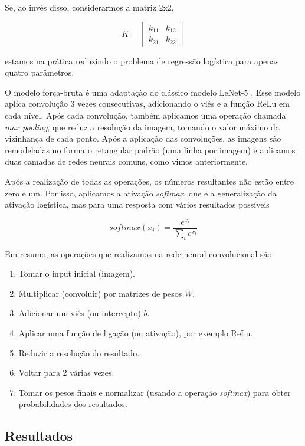 \documentclass[12pt,]{report}
\providecommand{\tightlist}{%
  \setlength{\itemsep}{0pt}\setlength{\parskip}{0pt}}
\begin{document}
Se, ao invés disso, considerarmos a matriz 2x2,

\[
K = \left[\begin{array}{rr}
k_{11} & k_{12}\\ 
k_{21} & k_{22}
\end{array}\right]
\]

estamos na prática reduzindo o problema de regressão logística para
apenas quatro parâmetros.

O modelo força-bruta é uma adaptação do clássico modelo LeNet-5
\citep{lecun2015lenet}. Esse modelo aplica convolução 3 vezes
consecutivas, adicionando o viés e a função ReLu em cada nível. Após
cada convolução, também aplicamos uma operação chamada \emph{max
pooling}, que reduz a resolução da imagem, tomando o valor máximo da
vizinhança de cada ponto. Após a aplicação das convoluções, as imagens
são remodeladas no formato retangular padrão (uma linha por imagem) e
aplicamos duas camadas de redes neurais comuns, como vimos
anteriormente.

Após a realização de todas as operações, os números resultantes não
estão entre zero e um. Por isso, aplicamos a ativação \emph{softmax},
que é a generalização da ativação logística, mas para uma resposta com
vários resultados possíveis

\[
softmax(x_i) = \frac{e^{x_i}}{\sum_ie^{x_i}}
\]

Em resumo, as operações que realizamos na rede neural convolucional são

\begin{enumerate}
\def\labelenumi{\arabic{enumi}.}
\tightlist
\item
  Tomar o input inicial (imagem).
\item
  Multiplicar (convoluir) por matrizes de pesos \(W\).
\item
  Adicionar um viés (ou intercepto) \(b\).
\item
  Aplicar uma função de ligação (ou ativação), por exemplo ReLu.
\item
  Reduzir a resolução do resultado.
\item
  Voltar para 2 várias vezes.
\item
  Tomar os pesos finais e normalizar (usando a operação \emph{softmax})
  para obter probabilidades dos resultados.
\end{enumerate}

\subsection{Resultados}\label{resultados}
\end{document}
